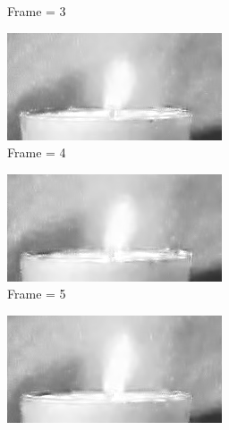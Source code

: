 \documentclass[a4paper, landscape]{article}
\begin{document}
\begin{figure}[H]
\begin{subfigure}{0.13\linewidth}
		\caption{Frame = 3}
	\end{subfigure}
	\begin{subfigure}{0.13\linewidth}
		\centering
		\includegraphics[width=\linewidth]{flame/reconstructed, T = 7, frame = 4.png}
		\caption{Frame = 4}
	\end{subfigure}
	\begin{subfigure}{0.13\linewidth}
		\centering
		\includegraphics[width=\linewidth]{flame/reconstructed, T = 7, frame = 5.png}
		\caption{Frame = 5}
	\end{subfigure}
	\begin{subfigure}{0.13\linewidth}
		\centering
		\includegraphics[width=\linewidth]{flame/reconstructed, T = 7, frame = 6.png}

\end{subfigure}
\end{figure}
\end{document}

